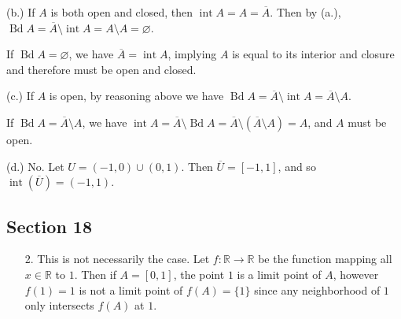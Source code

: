 \documentclass[11pt, reqno]{article}
\theoremstyle{plain}
\theoremstyle{definition}
\theoremstyle{remark}
\renewcommand{\emptyset}{\varnothing}
\newcommand{\RR}{\mathbb{R}}
\begin{document}
\begin{enumerate}
    (b.) If $A$ is both open and closed, then $\operatorname{int}A = A = \overline{A}$. Then
    by (a.), $\operatorname{Bd}A = \overline{A} \setminus \operatorname{int}A = A \setminus A = \emptyset$.

    If $\operatorname{Bd}A = \emptyset$, we have $\overline{A} = \operatorname{int}A$,
    implying $A$ is equal to its interior and closure and therefore must be open and closed. 

    (c.) If $A$ is open, by reasoning above we have $\operatorname{Bd}A = \overline{A} \setminus \operatorname{int}A = 
    \overline{A} \setminus A$. 

    If $\operatorname{Bd}A = \overline{A} \setminus A$, we have $\operatorname{int}A = \overline{A} \setminus \operatorname{Bd}A
    = \overline{A} \setminus (\overline{A}\setminus A) = A$, and $A$ must be open. 

    (d.) No. Let $U = (-1, 0) \cup (0 ,1)$. Then $\overline{U} = [-1,1]$, and so $\operatorname{int}(\overline{U}) = (-1,1)$.
\end{enumerate}

\subsection*{Section 18}

\begin{enumerate}
    \item[2.] This is not necessarily the case. Let $f: \RR \rightarrow \RR$ be the function mapping 
    all $x \in \RR$ to $1$. Then if $A = [0,1]$, the point $1$ is a limit point of $A$, however 
    $f(1) = 1$ is not a limit point of $f(A) = \{1\}$ since any neighborhood of $1$ only intersects $f(A)$
    at $1$. 
\end{enumerate}
\end{document}
